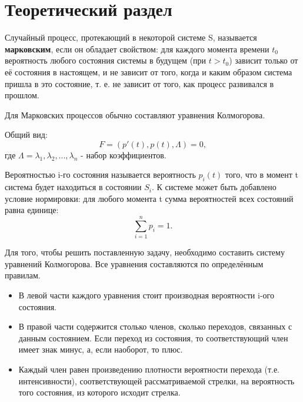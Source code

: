 \chapter{Теоретический раздел}

Случайный процесс, протекающий в некоторой системе S, называется \textbf{марковским}, если он обладает свойством: для каждого момента времени $t_0$ вероятность любого состояния системы в будущем (при $t > t_0$) зависит только от её состояния в настоящем, и не зависит от того, когда и каким образом система пришла в это состояние, т. е. не зависит от того, как процесс развивался в прошлом. 

Для Марковских процессов обычно составляют уравнения Колмогорова. 

Общий вид:
$$
F = (p'(t), p(t), \Lambda) = 0,
$$
где $\Lambda = \lambda_1, \lambda_2, ..., \lambda_n$ - набор коэффициентов.

Вероятностью i-го состояния называется вероятность $p_i(t)$ того, что в момент t система будет находиться в состоянии $S_i$. К системе может быть добавлено условие нормировки: для любого
момента t сумма вероятностей всех состояний равна единице:
$$
\sum_{i = 1}^n p_i = 1.
$$

Для того, чтобы решить поставленную задачу, необходимо составить систему
уравнений Колмогорова. Все уравнения составляются по определённым правилам.
\begin{itemize}
	\item В левой части каждого уравнения стоит производная вероятности i-ого состояния.
	
	\item В правой части содержится столько членов, сколько переходов, связанных с данным состоянием. Если переход из состояния, то соответствующий член имеет знак минус, а, если наоборот, то плюс. 
	
	\item Каждый член равен произведению плотности вероятности перехода (т.е. интенсивности), соответствующей рассматриваемой стрелки, на вероятность того состояния, из которого исходит стрелка.
\end{itemize}